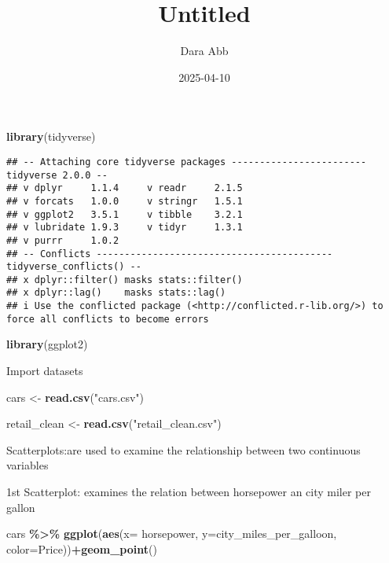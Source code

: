 \documentclass[
]{article}
\title{Untitled}
\author{Dara Abb}
\date{2025-04-10}
\newenvironment{Shaded}{\begin{snugshade}}{\end{snugshade}}
\newcommand{\AttributeTok}[1]{\textcolor[rgb]{0.13,0.29,0.53}{#1}}
\newcommand{\FunctionTok}[1]{\textcolor[rgb]{0.13,0.29,0.53}{\textbf{#1}}}
\newcommand{\NormalTok}[1]{#1}
\newcommand{\OtherTok}[1]{\textcolor[rgb]{0.56,0.35,0.01}{#1}}
\newcommand{\SpecialCharTok}[1]{\textcolor[rgb]{0.81,0.36,0.00}{\textbf{#1}}}
\newcommand{\StringTok}[1]{\textcolor[rgb]{0.31,0.60,0.02}{#1}}
\begin{document}
\maketitle

\begin{Shaded}
\begin{Highlighting}[]
\FunctionTok{library}\NormalTok{(tidyverse)}
\end{Highlighting}
\end{Shaded}

\begin{verbatim}
## -- Attaching core tidyverse packages ------------------------ tidyverse 2.0.0 --
## v dplyr     1.1.4     v readr     2.1.5
## v forcats   1.0.0     v stringr   1.5.1
## v ggplot2   3.5.1     v tibble    3.2.1
## v lubridate 1.9.3     v tidyr     1.3.1
## v purrr     1.0.2     
## -- Conflicts ------------------------------------------ tidyverse_conflicts() --
## x dplyr::filter() masks stats::filter()
## x dplyr::lag()    masks stats::lag()
## i Use the conflicted package (<http://conflicted.r-lib.org/>) to force all conflicts to become errors
\end{verbatim}

\begin{Shaded}
\begin{Highlighting}[]
\FunctionTok{library}\NormalTok{(ggplot2)}
\end{Highlighting}
\end{Shaded}

Import datasets

\begin{Shaded}
\begin{Highlighting}[]
\NormalTok{cars }\OtherTok{\textless{}{-}} \FunctionTok{read.csv}\NormalTok{(}\StringTok{"cars.csv"}\NormalTok{)}

\NormalTok{retail\_clean }\OtherTok{\textless{}{-}} \FunctionTok{read.csv}\NormalTok{(}\StringTok{"retail\_clean.csv"}\NormalTok{)}
\end{Highlighting}
\end{Shaded}

Scatterplots:are used to examine the relationship between two continuous
variables

1st Scatterplot: examines the relation between horsepower an city miler
per gallon

\begin{Shaded}
\begin{Highlighting}[]
\NormalTok{cars }\SpecialCharTok{\%\textgreater{}\%} \FunctionTok{ggplot}\NormalTok{(}\FunctionTok{aes}\NormalTok{(}\AttributeTok{x=}\NormalTok{ horsepower, }\AttributeTok{y=}\NormalTok{city\_miles\_per\_galloon, }\AttributeTok{color=}\NormalTok{Price))}\SpecialCharTok{+}\FunctionTok{geom\_point}\NormalTok{()}
\end{Highlighting}
\end{Shaded}
\end{document}
